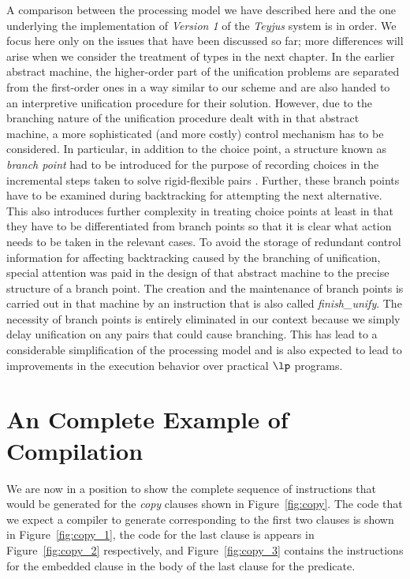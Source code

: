 A comparison between the processing model we have described here and
the one underlying the implementation of {\it Version 1} of the {\it
  Teyjus} system is in order. We focus here only on the issues that
have been discussed so far; more differences will arise when we
consider the treatment of types in the next chapter.
In the earlier abstract machine, the higher-order part of the
unification problems are separated from the first-order ones in a way similar
to our scheme and are also handed to an interpretive unification
procedure for their solution.
However, due to the branching nature of the unification procedure
dealt with in that abstract machine, a more sophisticated (and more
costly) control mechanism has to be considered. In particular, in
addition to the choice point, a
structure known as {\it branch point} had to be introduced for the
purpose of recording choices in the incremental steps taken to solve
rigid-flexible pairs \cite{N03treatment}. Further, these branch points
have to be
examined during backtracking for attempting the next alternative. This
also introduces further complexity in treating choice points at least
in that they have to be differentiated from branch points so that it
is clear what action needs to be taken in the relevant cases.
To avoid the storage of redundant control information for affecting
backtracking caused by the
branching of unification, special attention was paid in the design of
that abstract machine to the precise structure of a branch point.
The creation and the maintenance of branch points is carried out in
that machine by an instruction that is also called {\it finish\_unify}.
The necessity of branch points is entirely eliminated
in our context because we simply delay unification on any pairs that
could cause branching. This has lead to a considerable simplification
of the processing model and is also expected to lead to improvements
in the execution behavior over practical $\lp$ programs.

\section{An Complete Example of Compilation}\label{sec:inst_exp}
We are now in a position to show the complete sequence of instructions
that would be generated for the {\it copy} clauses shown in
Figure~\ref{fig:copy}. The code that we expect a compiler to generate
corresponding to the first two clauses is shown in
Figure~\ref{fig:copy_1}, the code for the last clause is appears in
Figure~\ref{fig:copy_2} respectively, and Figure~\ref{fig:copy_3}
contains the instructions for the embedded clause in the body of the
last clause for the predicate.

